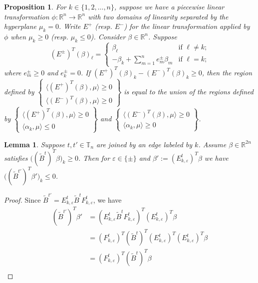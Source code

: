 \documentclass{amsart}
\newtheorem{lemma}[theorem]{Lemma}
\newtheorem{proposition}[theorem]{Proposition}
\numberwithin{theorem}{section}
\newcommand{\RR}{\mathbb{R}}
\newcommand{\TT}{\mathbb{T}}
\begin{document}
  \begin{proposition}
    For $k\in\{1,2,\ldots,n\}$, suppose we have a piecewise linear transformation $\phi:\RR^n\to\RR^n$ with two domains of linearity separated by the hyperplane $\mu_k = 0$.
    Write $E^+$ (resp. $E^-$) for the linear transformation applied by $\phi$ when $\mu_k\ge0$ (resp. $\mu_k\le 0$).
    Consider $\beta\in\RR^n$.
    Suppose 
    \[(E^\pm)^T(\beta)_\ell=\begin{cases} \beta_\ell & \text{if $\ell\ne k$;}\\ -\beta_k+\sum_{m=1}^n e^\pm_m \beta_m & \text{if $\ell=k$;}\end{cases}\]
    where $e^\pm_m\ge0$ and $e^\pm_k=0$.
    If $(E^+)^T(\beta)_k-(E^-)^T(\beta)_k\ge 0$, then the region defined by $\left\{\substack{\langle (E^+)^T(\beta),\mu\rangle \ge 0\\ \langle (E^-)^T(\beta),\mu\rangle \ge 0}\right\}$ is equal to the union of the regions defined by $\left\{\substack{\langle (E^+)^T(\beta),\mu\rangle \ge 0\\ \langle \alpha_k,\mu\rangle \le 0}\right\}$ and $\left\{\substack{\langle (E^-)^T(\beta),\mu\rangle \ge 0\\ \langle \alpha_k,\mu\rangle \ge 0}\right\}$.
  \end{proposition}

  \begin{lemma}
    Suppose $t,t'\in\TT_n$ are joined by an edge labeled by $k$.
    Assume $\beta\in\RR^{2n}$ satisfies $\big((\tilde B^t)^T\beta\big)_k\ge 0$.
    Then for $\varepsilon\in\{\pm\}$ and $\beta':=(E_{k,\varepsilon}^t)^T\beta$ we have $\big((\tilde B^{t'})^T\beta'\big)_k\le 0$.
  \end{lemma}
  \begin{proof}
    Since $\tilde B^{t'}=E^t_{k,\varepsilon} \tilde{B}^t F^t_{k,\varepsilon}$, we have
    \begin{align*}
      (\tilde B^{t'})^T\beta'
      &=
      (E^t_{k,\varepsilon} \tilde{B}^t F^t_{k,\varepsilon})^T (E^t_{k,\varepsilon})^T \beta\\
      &=
      (F^t_{k,\varepsilon})^T (\tilde{B}^t)^T (E^t_{k,\varepsilon})^T (E^t_{k,\varepsilon})^T \beta\\
      &=
      (F^t_{k,\varepsilon})^T (\tilde{B}^t)^T \beta\\
    \end{align*}
  \end{proof}
\end{document}
